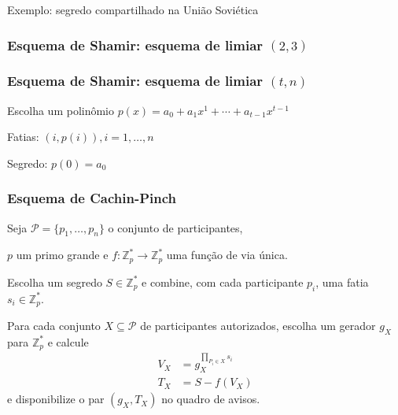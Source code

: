 \documentclass{beamer}
\begin{document}
\begin{frame}
    Exemplo: segredo compartilhado na União Soviética
\end{frame}

\begin{frame}
    \frametitle{Esquema de Shamir: esquema de limiar $(2, 3)$}
    \centering
\end{frame}

\begin{frame}
    \frametitle{Esquema de Shamir: esquema de limiar $(t, n)$}

    Escolha um polinômio $p(x) = a_0 + a_1 x^1 + \cdots + a_{t-1}x^{t-1}$

    Fatias: $(i, p(i)), i = 1, \ldots, n$

    Segredo: $p(0) = a_0$
\end{frame}

\begin{frame}
    \frametitle{Esquema de Cachin-Pinch}

    Seja $\mathcal P = \{p_1, \dots, p_n\}$ o conjunto de participantes,

    $p$ um primo grande e $f: \mathbb Z_p^* \to \mathbb Z_p^*$ uma função de via única.

     Escolha um segredo $S \in \mathbb Z_p^*$
    e combine, com cada participante $p_i$,
    uma fatia $s_i \in \mathbb Z_p^*$.

     Para cada conjunto $X \subseteq \mathcal P$
    de participantes autorizados,
    escolha um gerador $g_X$ para $\mathbb Z_p^*$
    e calcule
    \begin{align*}
        V_X &= g_X^{\prod_{P_i \in X} s_i} \\
        T_X &= S - f( V_X )
    \end{align*}
    e disponibilize o par $(g_X, T_X)$ no quadro de avisos.
\end{frame}
\end{document}
